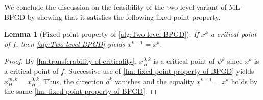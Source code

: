 \documentclass[11pt,reqno]{amsart}
\numberwithin{equation}{section}
\numberwithin{figure}{section}
\theoremstyle{plain}
\newtheorem{lemma}[theorem]{Lemma}
\theoremstyle{definition}
\begin{document}
We conclude the discussion on the feasibility of the two-level variant of ML-BPGD by showing that it satisfies the following fixed-point property.
\begin{lemma}[Fixed point property of \cref{alg:Two-level-BPGD}] \label{lm:fixed_point_property-MLBPGD}
    If $x^k$ a critical point of $f$, then \cref{alg:Two-level-BPGD} yields $x^{k+1} = x^k$.
\end{lemma}
\begin{proof}
    By \cref{lm:transferability-of-criticality}, $x_H^{0,k}$ is a critical point of $\psi^k$ since $x^k$ is a critical point of $f$. Successive use of \cref{lm: fixed point property of BPGD} yields $x^{m,k}_H = x^{0,k}_H$. Thus, the direction $d^k$ vanishes and the equality $x^{k+1} = x^k$ holds by the same \cref{lm: fixed point property of BPGD}.
\end{proof}
\end{document}
